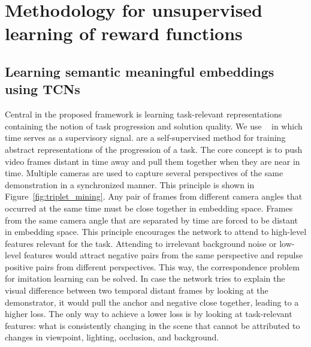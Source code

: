 \documentclass[\home/main.tex]{subfiles}
\begin{document}
\section{Methodology for unsupervised learning of reward functions}\label{sec:methodology}
\subsection{Learning semantic meaningful embeddings using TCNs}\label{subsec:tcn}
Central in the proposed framework is learning task-relevant representations containing the notion of task progression and solution quality. We use ~\cite{Sermanet2017TCN} in which time serves as a supervisory signal.  are a self-supervised method for training abstract representations of the progression of a task. The core concept is to push video frames distant in time away and pull them together when they are near in time. Multiple cameras are used to capture several perspectives of the same demonstration in a synchronized manner. This principle is shown in Figure~\ref{fig:triplet_mining}. Any pair of frames from different camera angles that occurred at the same time must be close together in embedding space. Frames from the same camera angle that are separated by time are forced to be distant in embedding space. This principle encourages the network to attend to high-level features relevant for the task.
Attending to irrelevant background noise or low-level features would attract negative pairs from the same perspective and repulse positive pairs from different perspectives. This way, the correspondence problem~\cite{BrassHeyes2005} for imitation learning can be solved. In case the network tries to explain the visual difference between two temporal distant frames by looking at the demonstrator, it would pull the anchor and negative close together, leading to a higher loss. The only way to achieve a lower loss is by looking at task-relevant features: what is consistently changing in the scene that cannot be attributed to changes in viewpoint, lighting, occlusion, and background.
\end{document}

